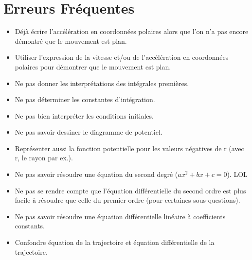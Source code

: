 \documentclass[a4paper]{article}
\begin{document}
\section{Erreurs Fréquentes}





\begin{itemize}

\item Déjà écrire l’accélération en coordonnées polaires alors que l’on n’a pas encore démontré que le mouvement est plan.

\item Utiliser l’expression de la vitesse et/ou de l’accélération en coordonnées polaires pour démontrer que le mouvement est plan.

\item Ne pas donner les interprétations des intégrales premières.

\item Ne pas déterminer les constantes d'intégration.

\item Ne pas bien interpréter les conditions initiales.

\item Ne pas savoir dessiner le diagramme de potentiel.

\item Représenter aussi la fonction potentielle pour les valeurs négatives de r (avec r, le rayon par ex.).

\item Ne pas savoir résoudre une équation du second degré ($ a x^2 + b x + c = 0 $). LOL

\item Ne pas se rendre compte que l’équation différentielle du second ordre est plus facile à résoudre que celle du premier ordre (pour certaines sous-questions).

\item Ne pas savoir résoudre une équation différentielle linéaire à coefficients constants.

\item Confondre équation de la trajectoire et équation différentielle de la trajectoire.

\end{itemize}
\end{document}
